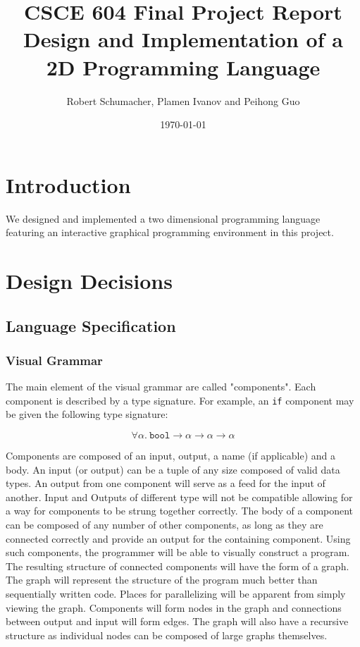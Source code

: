 \documentclass[12pt,UTF8,a4]{article}
\title{CSCE 604 Final Project Report \\ Design and Implementation of a 2D Programming Language}
\author{Robert Schumacher, Plamen Ivanov and Peihong Guo}
\date{\today}
\newcommand{\code}[1]{\texttt{#1}}
\newcommand{\type}[1]{\texttt{#1}}
\begin{document}
\maketitle
\singlespacing

\section{Introduction}
We designed and implemented a two dimensional programming language featuring an interactive graphical programming environment in this project.

\section{Design Decisions}
\subsection{Language Specification}
\subsubsection{Visual Grammar}
The main element of the visual grammar are called "components". Each
component is described by a type signature. For example, an \code{if}
component may be given the following type signature:

\[ \forall \alpha.\ \type{bool} \rightarrow \alpha \rightarrow \alpha \rightarrow \alpha \]

Components are composed of an input, output, a name (if applicable)
and a body.  An input (or output) can be a tuple of any size composed
of valid data types. An output from one component will serve as a feed
for the input of another. Input and Outputs of different type will not
be compatible allowing for a way for components to be strung together
correctly.  The body of a component can be composed of any number of
other components, as long as they are connected correctly and provide
an output for the containing component. Using such components, the
programmer will be able to visually construct a program. The resulting
structure of connected components will have the form of a graph. The
graph will represent the structure of the program much better than
sequentially written code.  Places for parallelizing will be apparent
from simply viewing the graph. Components will form nodes in the graph
and connections between output and input will form edges. The graph
will also have a recursive structure as individual nodes can be
composed of large graphs themselves.
\end{document}
